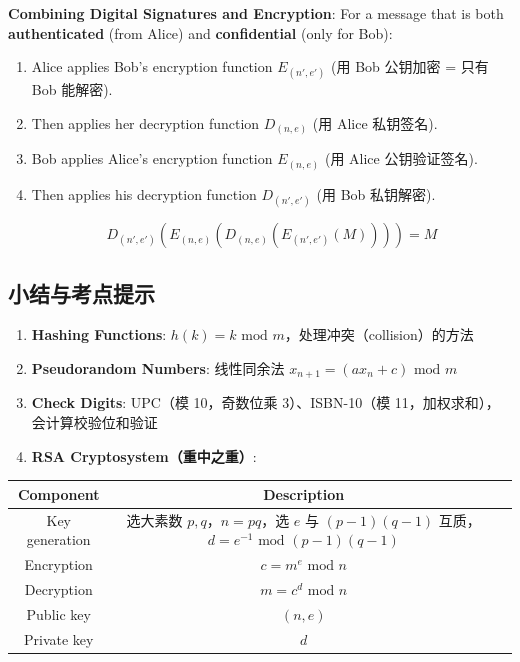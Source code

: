 \documentclass[10pt,a4paper,openany]{ctexbook}
\theoremstyle{definition}
\theoremstyle{remark}
\begin{document}
\textbf{Combining Digital Signatures and Encryption}:
For a message that is both \textbf{authenticated} (from Alice) and \textbf{confidential} (only for Bob):
\begin{enumerate}
\item Alice applies Bob's encryption function $E_{(n',e')}$ (用 Bob 公钥加密 = 只有 Bob 能解密).
\item Then applies her decryption function $D_{(n,e)}$ (用 Alice 私钥签名).
\item Bob applies Alice's encryption function $E_{(n,e)}$ (用 Alice 公钥验证签名).
\item Then applies his decryption function $D_{(n',e')}$ (用 Bob 私钥解密).

\[
D_{(n',e')}(E_{(n,e)}(D_{(n,e)}(E_{(n',e')}(M)))) = M
\]


\end{enumerate}

\vspace{-2pt}

\subsection{小结与考点提示}

\begin{enumerate}
\item \textbf{Hashing Functions}: $h(k) = k \text{ mod } m$，处理冲突（collision）的方法
\item \textbf{Pseudorandom Numbers}: 线性同余法 $x_{n+1} = (a x_n + c) \text{ mod } m$
\item \textbf{Check Digits}: UPC（模 10，奇数位乘 3）、ISBN-10（模 11，加权求和），会计算校验位和验证
\item \textbf{RSA Cryptosystem（重中之重）}:

\end{enumerate}

\begin{center}
\begin{tabular}{ccc}
\hline
Component & Description \\ \hline
Key generation & 选大素数 $p,q$，$n=pq$，选 $e$ 与 $(p-1)(q-1)$ 互质，$d = e^{-1} \text{ mod } (p-1)(q-1)$ &  \\
Encryption & $c = m^e \text{ mod } n$ &  \\
Decryption & $m = c^d \text{ mod } n$ &  \\
Public key & $(n, e)$ &  \\
Private key & $d$ &  \\
\hline
\end{tabular}

\end{center}
\end{document}
